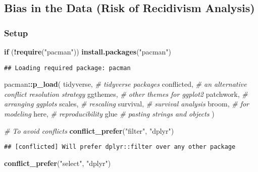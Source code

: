 \documentclass[
]{book}
\newenvironment{Shaded}{\begin{snugshade}}{\end{snugshade}}
\newcommand{\CommentTok}[1]{\textcolor[rgb]{0.56,0.35,0.01}{\textit{#1}}}
\newcommand{\ControlFlowTok}[1]{\textcolor[rgb]{0.13,0.29,0.53}{\textbf{#1}}}
\newcommand{\KeywordTok}[1]{\textcolor[rgb]{0.13,0.29,0.53}{\textbf{#1}}}
\newcommand{\NormalTok}[1]{#1}
\newcommand{\OperatorTok}[1]{\textcolor[rgb]{0.81,0.36,0.00}{\textbf{#1}}}
\newcommand{\StringTok}[1]{\textcolor[rgb]{0.31,0.60,0.02}{#1}}
\begin{document}
\hypertarget{bias-in-the-data-risk-of-recidivism-analysis}{%
\subsection{Bias in the Data (Risk of Recidivism Analysis)}\label{bias-in-the-data-risk-of-recidivism-analysis}}

\hypertarget{setup-4}{%
\subsubsection{Setup}\label{setup-4}}

\begin{Shaded}
\begin{Highlighting}[]
\ControlFlowTok{if}\NormalTok{ (}\OperatorTok{!}\KeywordTok{require}\NormalTok{(}\StringTok{"pacman"}\NormalTok{)) }\KeywordTok{install.packages}\NormalTok{(}\StringTok{"pacman"}\NormalTok{)}
\end{Highlighting}
\end{Shaded}

\begin{verbatim}
## Loading required package: pacman
\end{verbatim}

\begin{Shaded}
\begin{Highlighting}[]
\NormalTok{pacman}\OperatorTok{::}\KeywordTok{p\_load}\NormalTok{(}
\NormalTok{ tidyverse, }\CommentTok{\# tidyverse packages }
\NormalTok{ conflicted, }\CommentTok{\# an alternative conflict resolution strategy }
\NormalTok{ ggthemes, }\CommentTok{\# other themes for ggplot2 }
\NormalTok{ patchwork, }\CommentTok{\# arranging ggplots}
\NormalTok{ scales, }\CommentTok{\# rescaling }
\NormalTok{ survival, }\CommentTok{\# survival analysis}
\NormalTok{ broom, }\CommentTok{\# for modeling}
\NormalTok{ here, }\CommentTok{\# reproducibility }
\NormalTok{ glue }\CommentTok{\# pasting strings and objects }
\NormalTok{)}

\CommentTok{\# To avoid conflicts }
\KeywordTok{conflict\_prefer}\NormalTok{(}\StringTok{"filter"}\NormalTok{, }\StringTok{"dplyr"}\NormalTok{) }
\end{Highlighting}
\end{Shaded}

\begin{verbatim}
## [conflicted] Will prefer dplyr::filter over any other package
\end{verbatim}

\begin{Shaded}
\begin{Highlighting}[]
\KeywordTok{conflict\_prefer}\NormalTok{(}\StringTok{"select"}\NormalTok{, }\StringTok{"dplyr"}\NormalTok{) }
\end{Highlighting}
\end{Shaded}
\end{document}
